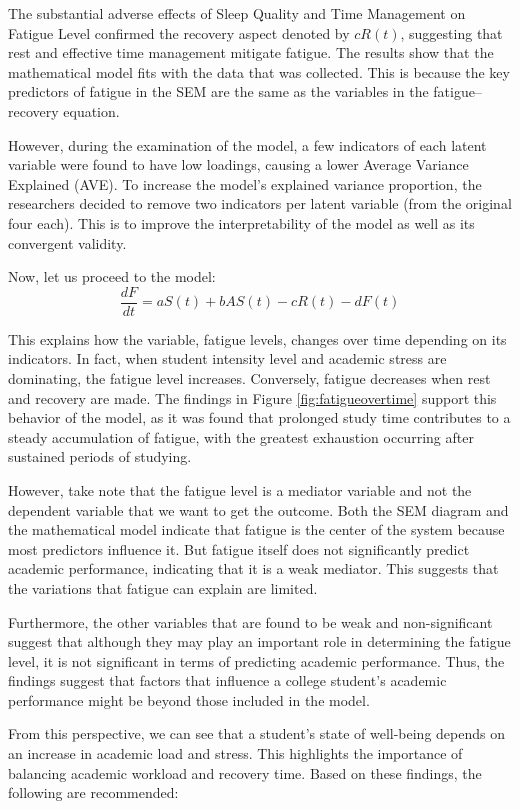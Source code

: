 \documentclass [12pt]{article}
\begin{document}
The substantial adverse effects of Sleep Quality and Time Management on Fatigue Level confirmed the recovery aspect denoted by $cR(t)$, suggesting that rest and effective time management mitigate fatigue. The results show that the mathematical model fits with the data that was collected. This is because the key predictors of fatigue in the SEM are the same as the variables in the fatigue–recovery equation.

However, during the examination of the model, a few indicators of each latent variable were found to have low loadings, causing a lower Average Variance Explained (AVE). To increase the model’s explained variance proportion, the researchers decided to remove two indicators per latent variable (from the original four each). This is to improve the interpretability of the model as well as its convergent validity. 

Now, let us proceed to the model:
\[
\frac{dF}{dt} = aS(t) + bAS(t) - cR(t) - dF(t)
\]

This explains how the variable, fatigue levels, changes over time depending on its indicators. In fact, when student intensity level and academic stress are dominating, the fatigue level increases. Conversely, fatigue decreases when rest and recovery are made. The findings in Figure \ref{fig:fatigueovertime} support this behavior of the model, as it was found that prolonged study time contributes to a steady accumulation of fatigue, with the greatest exhaustion occurring after sustained periods of studying. 

However, take note that the fatigue level is a mediator variable and not the dependent variable that we want to get the outcome. Both the SEM diagram and the mathematical model indicate that fatigue is the center of the system because most predictors influence it. But fatigue itself does not significantly predict academic performance, indicating that it is a weak mediator. This suggests that the variations that fatigue can explain are limited. 

Furthermore, the other variables that are found to be weak and non-significant suggest that although they may play an important role in determining the fatigue level, it is not significant in terms of predicting academic performance. Thus, the findings suggest that factors that influence a college student’s academic performance might be beyond those included in the model.

From this perspective, we can see that a student’s state of well-being depends on an increase in academic load and stress. This highlights the importance of balancing academic workload and recovery time. Based on these findings, the following are recommended:
\end{document}
